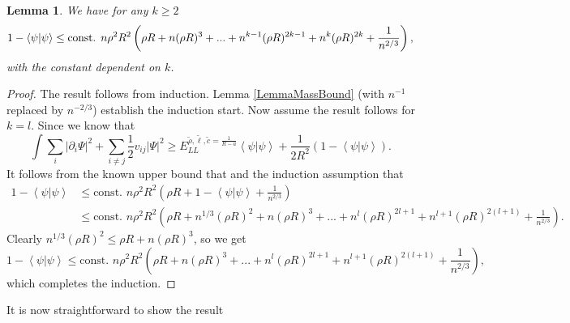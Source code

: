 \documentclass[a4paper,11pt]{article}
\newcommand{\abs}[1]{\left\lvert #1 \right\rvert}
\renewcommand{\braket}[1]{\left\langle#1\right\rangle}
\newtheorem{lemma}{Lemma}
\numberwithin{equation}{section}
\begin{document}
		\begin{lemma}\label{LemmaImprovedMassBound}
		We have for any $ k\geq 2 $
		\begin{equation}\label{EqImprovedMassBound}
		\begin{aligned}
		1-\braket{\psi|\psi} \leq \textnormal{const. }n\rho^2R^2\left(\rho R+ n(\rho R)^3+...+n^{k-1}(\rho R)^{2k-1}+n^k(\rho R)^{2k}+\frac{1}{n^{2/3}}\right),
		\end{aligned}
		\end{equation}
		with the constant dependent on $ k $.
	\end{lemma}
	\begin{proof}
		The result follows from induction. Lemma \ref{LemmaMassBound} (with $ n^{-1} $ replaced by $ n^{-2/3} $) establish the induction start. Now assume the result follows for $ k=l $. Since we know that \begin{equation}
		\int \sum_{i}\abs{\partial_i\Psi}^2+\sum_{i\neq j} \frac{1}{2}v_{ij}\abs{\Psi}^2\geq E_{LL}^{\tilde{\rho},\tilde{\ell},\tilde{c}=\frac{1}{R-a}}\braket{\psi|\psi}+ \frac{1}{2R^2}(1-\braket{\psi|\psi}).
		\end{equation}
		It follows from the known upper bound that and the induction assumption that \begin{equation}
		\begin{aligned}
		1-\braket{\psi|\psi}&\leq \text{const. }n\rho^2 R^2\left(\rho R+1-\braket{\psi|\psi}+\frac{1}{n^{2/3}}\right) \\&\leq \text{const. }n\rho^2 R^2\left(\rho R+n^{1/3}(\rho R)^2+n(\rho R)^3+...+n^{l}(\rho R)^{2l+1}+n^{l+1}(\rho R)^{2(l+1)}+\frac{1}{n^{2/3}}\right).
		\end{aligned}
		\end{equation}
		Clearly $ n^{1/3}(\rho R)^2\leq \rho R + n(\rho R)^3 $, so we get \begin{equation}
		1-\braket{\psi|\psi}\leq \text{const. }n\rho^2 R^2\left(\rho R+n(\rho R)^3+...+n^{l}(\rho R)^{2l+1}+n^{l+1}(\rho R)^{2(l+1)}+\frac{1}{n^{2/3}}\right),
		\end{equation}
		which completes the induction. 
	\end{proof}
	
	It is now straightforward to show the result
	
\end{document}
